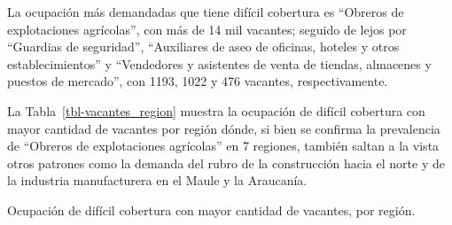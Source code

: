 \documentclass[
  11pt,
]{article}
\begin{document}
La ocupación más demandadas que tiene difícil cobertura es ``Obreros de
explotaciones agrícolas'', con más de 14 mil vacantes; seguido de lejos
por ``Guardias de seguridad'', ``Auxiliares de aseo de oficinas, hoteles
y otros establecimientos'' y ``Vendedores y asistentes de venta de
tiendas, almacenes y puestos de mercado'', con 1193, 1022 y 476
vacantes, respectivamente.

La Tabla~\ref{tbl-vacantes_region} muestra la ocupación de difícil
cobertura con mayor cantidad de vacantes por región dónde, si bien se
confirma la prevalencia de ``Obreros de explotaciones agrícolas'' en 7
regiones, también saltan a la vista otros patrones como la demanda del
rubro de la construcción hacia el norte y de la industria manufacturera
en el Maule y la Araucanía.

\begin{table}

\caption{\label{tbl-vacantes_region}Ocupación de difícil cobertura con
mayor cantidad de vacantes, por región.}

\centering{

}
\end{table}
\end{document}

